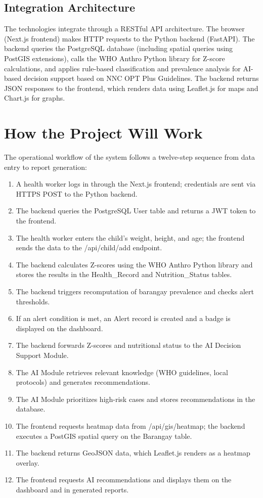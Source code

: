 \documentclass[12pt, a4paper]{report}
\begin{document}
\subsection{Integration Architecture}
\label{subsec:integration}
The technologies integrate through a RESTful API architecture. The browser (Next.js frontend) makes HTTP requests to the Python backend (FastAPI). The backend queries the PostgreSQL database (including spatial queries using PostGIS extensions), calls the WHO Anthro Python library for Z-score calculations, and applies rule-based classification and prevalence analysis for AI-based decision support based on NNC OPT Plus Guidelines. The backend returns JSON responses to the frontend, which renders data using Leaflet.js for maps and Chart.js for graphs.

\section{How the Project Will Work}
\label{sec:how_project_works}
The operational workflow of the system follows a twelve-step sequence from data entry to report generation:
\begin{enumerate}
    \item A health worker logs in through the Next.js frontend; credentials are sent via HTTPS POST to the Python backend.
    \item The backend queries the PostgreSQL User table and returns a JWT token to the frontend.
    \item The health worker enters the child's weight, height, and age; the frontend sends the data to the /api/child/add endpoint.
    \item The backend calculates Z-scores using the WHO Anthro Python library and stores the results in the Health\_Record and Nutrition\_Status tables.
    \item The backend triggers recomputation of barangay prevalence and checks alert thresholds.
    \item If an alert condition is met, an Alert record is created and a badge is displayed on the dashboard.
    \item The backend forwards Z-scores and nutritional status to the AI Decision Support Module.
    \item The AI Module retrieves relevant knowledge (WHO guidelines, local protocols) and generates recommendations.
    \item The AI Module prioritizes high-risk cases and stores recommendations in the database.
    \item The frontend requests heatmap data from /api/gis/heatmap; the backend executes a PostGIS spatial query on the Barangay table.
    \item The backend returns GeoJSON data, which Leaflet.js renders as a heatmap overlay.
    \item The frontend requests AI recommendations and displays them on the dashboard and in generated reports.
\end{enumerate}
\end{document}
